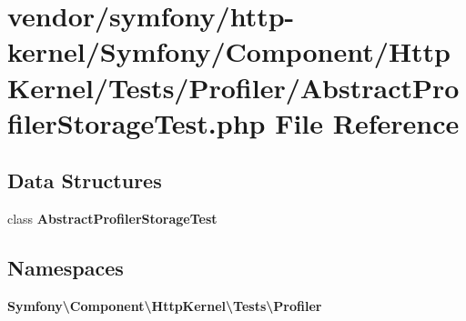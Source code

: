\section{vendor/symfony/http-\/kernel/\+Symfony/\+Component/\+Http\+Kernel/\+Tests/\+Profiler/\+Abstract\+Profiler\+Storage\+Test.php File Reference}
\label{_abstract_profiler_storage_test_8php}
\subsection*{Data Structures}
\begin{DoxyCompactItemize}
\item 
class {\bf Abstract\+Profiler\+Storage\+Test}
\end{DoxyCompactItemize}
\subsection*{Namespaces}
\begin{DoxyCompactItemize}
\item 
 {\bf Symfony\textbackslash{}\+Component\textbackslash{}\+Http\+Kernel\textbackslash{}\+Tests\textbackslash{}\+Profiler}
\end{DoxyCompactItemize}
